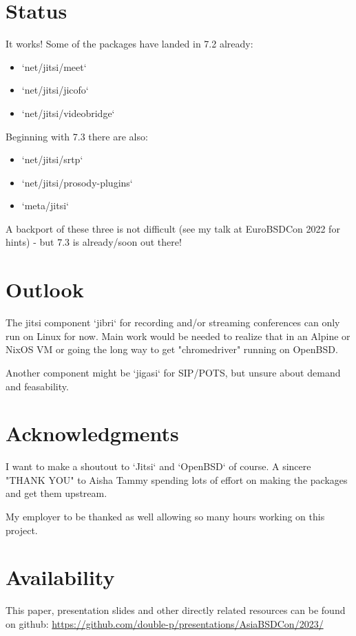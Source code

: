 \documentclass[10pt,conference]{IEEEtran}
\begin{document}
\section{Status}
It works! Some of the packages have landed in 7.2 already:
\begin{itemize}
\item `net/jitsi/meet`
\item `net/jitsi/jicofo`
\item `net/jitsi/videobridge`
\end{itemize}

Beginning with 7.3 there are also:
\begin{itemize}
\item `net/jitsi/srtp`
\item `net/jitsi/prosody-plugins`
\item `meta/jitsi`
\end{itemize}

A backport of these three is not difficult (see my talk at EuroBSDCon 2022
for hints) - but 7.3 is already/soon out there!

\section{Outlook}
The jitsi component `jibri` for recording and/or streaming conferences can only run
on Linux for now. Main work would be needed to realize that in an Alpine or NixOS VM or
going the long way to get "chromedriver" running on OpenBSD.

Another component might be `jigasi` for SIP/POTS, but unsure about demand and feasability.

\section{Acknowledgments}
I want to make a shoutout to `Jitsi` and `OpenBSD` of course. A sincere "THANK YOU" to
Aisha Tammy spending lots of effort on making the packages and get them upstream.

My employer to be thanked as well allowing so many hours working on this project.


\section{Availability}
This paper, presentation slides and other directly related resources can be found on github:
\url{https://github.com/double-p/presentations/AsiaBSDCon/2023/}
\end{document}
